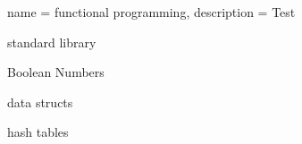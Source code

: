 
{name = functional programming,
description = {Test %
}}

standard library

Boolean Numbers

data structs

hash tables

